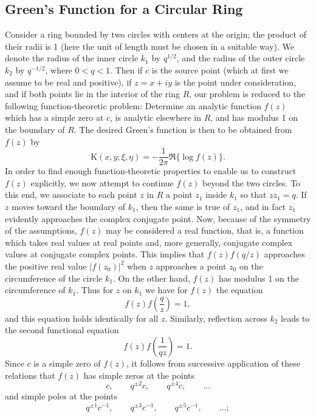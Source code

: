 \subsection{Green's Function for a Circular Ring}
Consider a ring bounded by two circles with centers at the origin; the product of their radii is 1 (here the unit of length must be chosen in a suitable way). We denote the radius of the inner circle $k_1$ by $q^{1/2}$, and the radius of the outer circle $k_2$ by $q^{-1/2}$, where $0<q<1$. Then if $c$ is the source point (which at first we assume to be real and positive), if $z=x+iy$ is the point under consideration, and if both points lie in the interior of the ring $R$, our problem is reduced to the following function-theoretic problem: Determine an analytic function $f(z)$ which has a simple zero at $c$, is analytic elsewhere in $R$, and has modulus 1 on the boundary of $R$. The desired Green's function is then to be obtained from $f(z)$ by
\[
\mathrm K(x,y;\xi,\eta)=-\frac1{2\pi}\Re\{\log f(z)\}.
\]
In order to find enough function-theoretic properties to enable us to construct $f(z)$ explicitly, we now attempt to continue $f(z)$ beyond the two circles. To this end, we associate to each point $z$ in $R$ a point $z_1$ inside $k_1$ so that $zz_1=q$. If $z$ moves toward the boundary of $k_1$, then the same is true of $z_1$, and in fact $z_1$ evidently approaches the complex conjugate point. Now, because of the symmetry of the assumptions, $f(z)$ may be considered a real function, that is, a function which takes real values at real points and, more generally, conjugate complex values at conjugate complex points. This implies that $f(z)f(q/z)$ approaches the positive real value $|f(z_0)|^2$ when $z$ approaches a point $z_0$ on the circumference of the circle $k_1$. On the other hand, $f(z)$ has modulus 1 on the circumference of $k_1$. Thus for $z$ on $k_1$ we have for $f(z)$ the equation
\begin{equation}\tag{112}
f(z)f\left(\frac qz\right)=1,
\end{equation}
and this equation holds identically for all $z$. Similarly, reflection across $k_2$ leads to the second functional equation
\begin{equation}\tag{113}
f(z)f\left(\frac1{qz}\right)=1.
\end{equation}
Since $c$ is a simple zero of $f(z)$, it follows from successive application of these relations that $f(z)$ has simple zeros at the points
\[
c,\qquad q^{\pm2}c,\qquad q^{\pm4}c,\qquad\ldots
\]
and simple poles at the points
\[
q^{\pm1}c^{-1},\qquad q^{\pm3}c^{-1},\qquad q^{\pm5}c^{-1},\qquad\ldots;
\]

